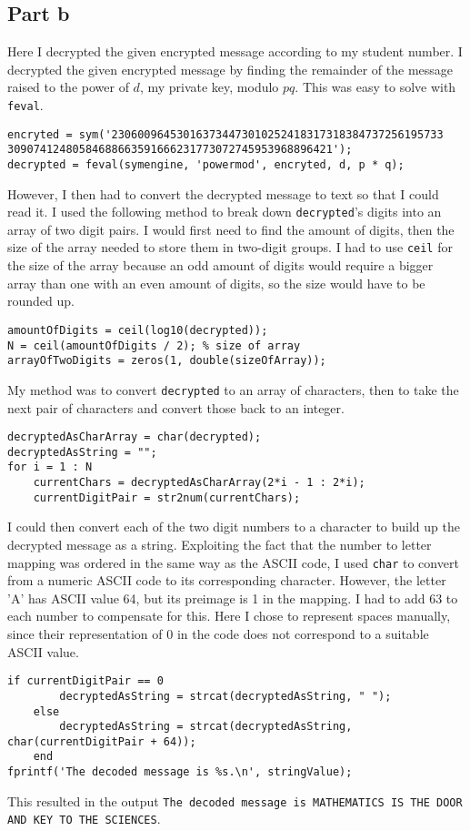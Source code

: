 \documentclass[11pt]{article}
\begin{document}
\subsection*{Part b}
Here I decrypted the given encrypted message according to my student number.
I decrypted the given encrypted message by finding the remainder of the message raised to the power of $d$, my private key, modulo $pq$. This was easy to solve with \texttt{feval}.
\begin{Verbatim}[xleftmargin=0.5in]
encryted = sym('230600964530163734473010252418317318384737256195733
30907412480584688663591666231773072745953968896421');
decrypted = feval(symengine, 'powermod', encryted, d, p * q);
\end{Verbatim}
However, I then had to convert the decrypted message to text so that I could read it. I used the following method to break down \texttt{decrypted}'s digits into an array of two digit pairs. I would first need to find the amount of digits, then the size of the array needed to store them in two-digit groups. I had to use \texttt{ceil} for the size of the array because an odd amount of digits would require a bigger array than one with an even amount of digits, so the size would have to be rounded up.
\begin{Verbatim}[xleftmargin=0.5in]
amountOfDigits = ceil(log10(decrypted));
N = ceil(amountOfDigits / 2); % size of array
arrayOfTwoDigits = zeros(1, double(sizeOfArray));
\end{Verbatim}
My method was to convert \texttt{decrypted} to an array of characters, then to take the next pair of characters and convert those back to an integer.
\begin{Verbatim}[xleftmargin=0.5in]
decryptedAsCharArray = char(decrypted);
decryptedAsString = "";
for i = 1 : N
    currentChars = decryptedAsCharArray(2*i - 1 : 2*i);
    currentDigitPair = str2num(currentChars);
\end{Verbatim}
I could then convert each of the two digit numbers to a character to build up the decrypted message as a string. Exploiting the fact that the number to letter mapping was ordered in the same way as the ASCII code, I used \texttt{char} to convert from a numeric ASCII code to its corresponding character. However, the letter 'A' has ASCII value 64, but its preimage is 1 in the mapping. I had to add 63 to each number to compensate for this. Here I chose to represent spaces manually, since their representation of 0 in the code does not correspond to a suitable ASCII value.
\begin{Verbatim}[xleftmargin=0.5in]
    if currentDigitPair == 0
        decryptedAsString = strcat(decryptedAsString, " ");
    else
        decryptedAsString = strcat(decryptedAsString, char(currentDigitPair + 64));
    end
fprintf('The decoded message is %s.\n', stringValue);
\end{Verbatim}
This resulted in the output \texttt{The decoded message is MATHEMATICS IS THE DOOR AND KEY TO THE SCIENCES}.
\end{document}
